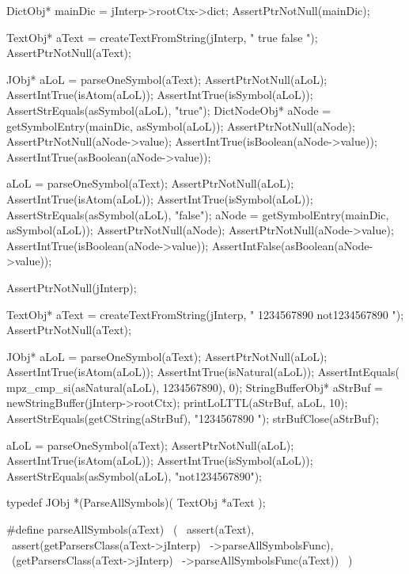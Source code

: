   DictObj* mainDic = jInterp->rootCtx->dict;
  AssertPtrNotNull(mainDic);

  TextObj* aText =
    createTextFromString(jInterp, " true false ");
  AssertPtrNotNull(aText);

  JObj* aLoL = parseOneSymbol(aText);
  AssertPtrNotNull(aLoL);
  AssertIntTrue(isAtom(aLoL));
  AssertIntTrue(isSymbol(aLoL));
  AssertStrEquals(asSymbol(aLoL), "true");
  DictNodeObj* aNode =
    getSymbolEntry(mainDic, asSymbol(aLoL));
  AssertPtrNotNull(aNode);
  AssertPtrNotNull(aNode->value);
  AssertIntTrue(isBoolean(aNode->value));
  AssertIntTrue(asBoolean(aNode->value));

  aLoL = parseOneSymbol(aText);
  AssertPtrNotNull(aLoL);
  AssertIntTrue(isAtom(aLoL));
  AssertIntTrue(isSymbol(aLoL));
  AssertStrEquals(asSymbol(aLoL), "false");
  aNode = getSymbolEntry(mainDic, asSymbol(aLoL));
  AssertPtrNotNull(aNode);
  AssertPtrNotNull(aNode->value);
  AssertIntTrue(isBoolean(aNode->value));
  AssertIntFalse(asBoolean(aNode->value));
\stopCTest
\stopTestCase

\startCTest
  AssertPtrNotNull(jInterp);

  TextObj* aText =
    createTextFromString(jInterp, " 1234567890 not1234567890 ");
  AssertPtrNotNull(aText);

  JObj* aLoL = parseOneSymbol(aText);
  AssertPtrNotNull(aLoL);
  AssertIntTrue(isAtom(aLoL));
  AssertIntTrue(isNatural(aLoL));
  AssertIntEquals( mpz_cmp_si(asNatural(aLoL), 1234567890), 0);
  StringBufferObj* aStrBuf = newStringBuffer(jInterp->rootCtx);
  printLoLTTL(aStrBuf, aLoL, 10);
  AssertStrEquals(getCString(aStrBuf), "1234567890 ");
  strBufClose(aStrBuf);

  aLoL = parseOneSymbol(aText);
  AssertPtrNotNull(aLoL);
  AssertIntTrue(isAtom(aLoL));
  AssertIntTrue(isSymbol(aLoL));
  AssertStrEquals(asSymbol(aLoL), "not1234567890");
\stopCTest
\stopTestCase
\stopTestSuite


\startCHeader
typedef JObj *(ParseAllSymbols)(
  TextObj *aText
);

#define parseAllSymbols(aText)              \
  (                                         \
    assert(aText),                          \
    assert(getParsersClass(aText->jInterp)  \
      ->parseAllSymbolsFunc),               \
    (getParsersClass(aText->jInterp)        \
      ->parseAllSymbolsFunc(aText))         \
  )
\stopCHeader

